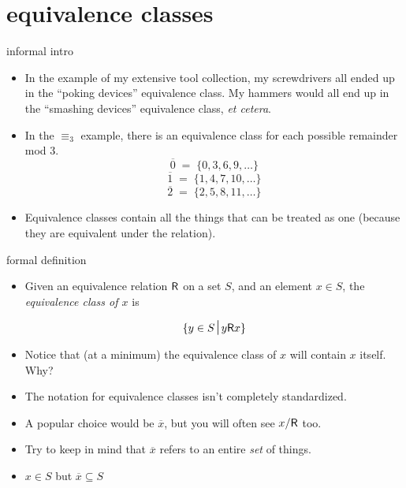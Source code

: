 \documentclass[handout,landscape]{beamer}
\begin{document}
\section{equivalence classes}

\begin{frame}{informal intro}
\begin{itemize}
\item In the example of my extensive tool collection, my screwdrivers all ended up in the ``poking devices'' equivalence class.  My hammers would all end up in the ``smashing devices'' equivalence class, {\em et cetera}. \pause
\item In the $\equiv_3$ example, there is an equivalence class for each possible remainder mod 3. \pause
\[ \overline{0} \; = \; \{0, 3, 6, 9, \ldots \} \]
\[ \overline{1} \; = \; \{1, 4, 7, 10, \ldots \} \]
\[ \overline{2} \; = \; \{2, 5, 8, 11, \ldots \} \]
\pause

\item Equivalence classes contain all the things that can be treated as one (because they are equivalent under the relation). \pause
\end{itemize}
\end{frame}

\begin{frame}{formal definition}
\begin{itemize}
\item Given an equivalence relation $\mbox{\textsf R}$ on a set $S$, and an element $x \in S$, the {\em equivalence class of $x$} is 

\[ \{ y \in S \suchthat y \relR x \} \]
\pause

\item Notice that (at a minimum) the equivalence class of $x$ will contain $x$ itself. \pause Why? \pause
\item The notation for equivalence classes isn't completely standardized. \pause
\item A popular choice would be $\overline{x}$, but you will often see $x/\mbox{\textsf R}$ too. \pause
\item Try to keep in mind that $\overline{x}$ refers to an entire {\em set} of things. \pause
\item $x \in S$ but $\overline{x} \subseteq S$
\end{itemize}
\end{frame}
\end{document}
